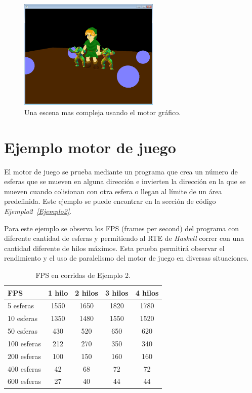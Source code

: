 \begin{figure}[!ht!]
\centering
\includegraphics[width=0.6\textwidth]{link}
\caption[Ejemplo 2 - Escena más compleja del motor de gráfico]{Una escena mas compleja usando el motor gráfico.}
\label{fig:Ejemplo_2}
\end{figure}

\section{Ejemplo motor de juego}

El motor de juego se prueba mediante un programa que crea un número de esferas que se mueven en alguna dirección e invierten la dirección en la que se mueven cuando colisionan con otra esfera o llegan al límite de un área predefinida. Este ejemplo se puede encontrar en la sección de código \emph{Ejemplo2~\ref{Ejemplo2}}.

Para este ejemplo se observa los FPS (frames per second) del programa con diferente cantidad de esferas y permitiendo al RTE de \emph{Haskell} correr con una cantidad diferente de hilos máximos. Esta prueba permitirá observar el rendimiento y el uso de paralelismo del motor de juego en diversas situaciones.

\begin{table}
  \centering
\begin{tabular}{ | l | c | c | c | c | }
 \hline
 FPS & 1 hilo &2 hilos&3 hilos&4 hilos\\
 \hline
 5 esferas & 1550	& 1650	& 1820	& 1780 \\ \hline
 10 esferas & 1350	& 1480	& 1550	& 1520 \\ \hline
 50 esferas & 430	& 520	& 650	& 620 \\ \hline
 100 esferas & 212	& 270	& 350	& 340 \\ \hline
 200 esferas & 100	& 150	& 160	& 160 \\ \hline
 400 esferas & 42	& 68	& 72	& 72 \\ \hline
 600 esferas & 27	& 40	& 44	& 44 \\
 \hline
\end{tabular}
\caption{FPS en corridas de Ejemplo 2.}
\label{table:Ejemplo2}
\end{table}

